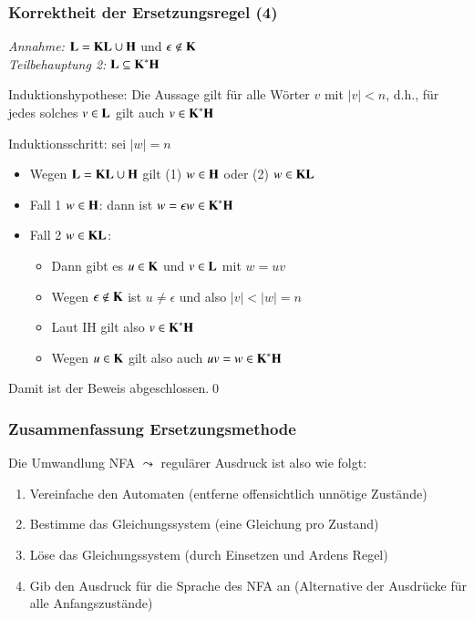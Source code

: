 \documentclass[onlymath]{beamer}
\begin{document}
\begin{frame}[t]\frametitle{Korrektheit der Ersetzungsregel (4)}

\emph{Annahme:} $\textbf{\textcolor{black}{L}}= \textbf{\textcolor{black}{K}}\textbf{\textcolor{black}{L}}\cup\textbf{\textcolor{black}{H}}$ und $\epsilon\notin\textbf{\textcolor{black}{K}}$\\[1ex]

\emph{Teilbehauptung 2:} $\textbf{\textcolor{black}{L}}\subseteq\textbf{\textcolor{black}{K}}^*\textbf{\textcolor{black}{H}}$\\[1ex]

\medskip

\alert{Induktionshypothese:} Die Aussage gilt für alle Wörter $v$ mit $|v|<n$, d.h., für jedes solches $v\in\textbf{\textcolor{black}{L}}$ gilt auch $v\in\textbf{\textcolor{black}{K}}^*\textbf{\textcolor{black}{H}}$ \pause
\medskip

\alert{Induktionsschritt:} sei $|w|=n$\pause
\begin{itemize}
\item Wegen $\textbf{\textcolor{black}{L}}= \textbf{\textcolor{black}{K}}\textbf{\textcolor{black}{L}}\cup\textbf{\textcolor{black}{H}}$ gilt (1) $w\in\textbf{\textcolor{black}{H}}$ oder (2) $w\in \textbf{\textcolor{black}{K}}\textbf{\textcolor{black}{L}}$\pause
\item Fall 1 $w\in\textbf{\textcolor{black}{H}}$: dann ist $w=\epsilon w \in \textbf{\textcolor{black}{K}}^*\textbf{\textcolor{black}{H}}$\pause
\item Fall 2 $w\in \textbf{\textcolor{black}{K}}\textbf{\textcolor{black}{L}}$\pause:
	\begin{itemize}
	\item Dann gibt es $u\in\textbf{\textcolor{black}{K}}$ und $v\in\textbf{\textcolor{black}{L}}$ mit $w=uv$\pause
	\item Wegen $\epsilon\notin\textbf{\textcolor{black}{K}}$ ist $u\neq\epsilon$ und also $|v|<|w|=n$\pause
	\item Laut IH gilt also $v\in\textbf{\textcolor{black}{K}}^*\textbf{\textcolor{black}{H}}$\pause
	\item Wegen $u\in\textbf{\textcolor{black}{K}}$ gilt also auch $uv=w\in\textbf{\textcolor{black}{K}}^*\textbf{\textcolor{black}{H}}$
	\end{itemize}
\end{itemize}

Damit ist der Beweis abgeschlossen.\qed

\end{frame}

\begin{frame}\frametitle{Zusammenfassung Ersetzungsmethode}

Die Umwandlung NFA $\leadsto$ regulärer Ausdruck ist also wie folgt:

\begin{enumerate}[(1)]
\item \alert{Vereinfache den Automaten} (entferne offensichtlich unnötige Zustände)
\item \alert{Bestimme das Gleichungssystem} (eine Gleichung pro Zustand)
\item \alert{Löse das Gleichungssystem} (durch Einsetzen und Ardens Regel)
\item \alert{Gib den Ausdruck für die Sprache des NFA an} (Alternative der Ausdrücke für alle Anfangszustände)
\end{enumerate}

\end{frame}
\end{document}
